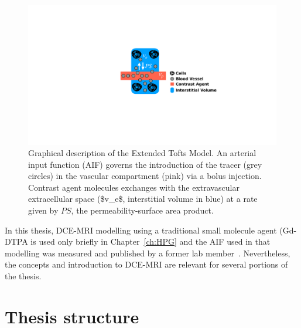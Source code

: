 \begin{figure}[htbp]
   \centering
   \includegraphics[width=\textwidth]{intro/intro-images/XTofts.pdf}
   \caption[Extended Tofts Model]{Graphical description of the Extended Tofts Model. An arterial input function (\acs{AIF}) governs the introduction of the tracer (grey circles) in the vascular compartment (pink) via a bolus injection. Contrast agent molecules exchanges with the extravascular extracellular space (\acs{$v_e$}, interstitial volume in blue) at a rate given by $PS$, the permeability-surface area product.}
   \label{XTofts}
\end{figure}

In this thesis, \acs{DCE-MRI} modelling using a traditional small molecule agent (\acs{Gd-DTPA} is used only briefly in Chapter~\ref{ch:HPG} and the \acs{AIF} used in that modelling was measured and published by a former lab member~\cite{Moroz:2013ee}.
Nevertheless, the concepts and introduction to \acs{DCE-MRI} are relevant for several portions of the thesis. 

\section{Thesis structure}

